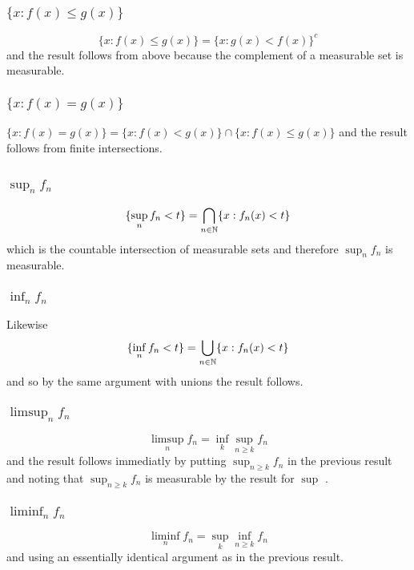 \documentclass{unswmaths}
\begin{document}
\subsubsection{$\{ x : f(x) \leq g(x) \}$}

$$ \{ x : f(x) \leq g(x) \} = \{ x : g(x) < f(x) \}^{c} $$ and the result follows from above because the complement of a measurable set is measurable.

\subsubsection{$\{ x : f(x) = g(x) \}$}

$\{ x : f(x) = g(x) \} = \{ x : f(x) < g(x) \} \cap \{ x : f(x) \leq g(x) \} $ and the result follows from finite intersections.

\subsection{}
\subsubsection{ $ \sup_n f_n $ }

$$
    \{ \sup_n f_n < t \} = \bigcap_{n \in \mathbb{N}} \{x : f_n(x) < t \}
$$
which is the countable intersection of measurable sets and therefore $ \sup_n f_n $ is measurable.

\subsubsection{ $ \inf_n f_n $ }

Likewise 
$$
    \{ \inf_n f_n < t \} = \bigcup_{n \in \mathbb{N}} \{ x : f_n(x) < t \} 
$$
and so by the same argument with unions the result follows. 

\subsubsection{$ \limsup_n f_n $}
$$
    \limsup_n f_n = \inf_k \sup_{n\geq k} f_n
$$
and the result follows immediatly by putting $ \sup_{n \geq k} f_n $ in the previous result and noting that $ \sup_{n \geq k} f_n$ 
is measurable by the result for $ \sup$ .

\subsubsection{$ \liminf_n f_n $}
$$
    \liminf_n f_n = \sup_k \inf_{n\geq k} f_n
$$
and using an essentially identical argument as in the previous result.
\end{document}
